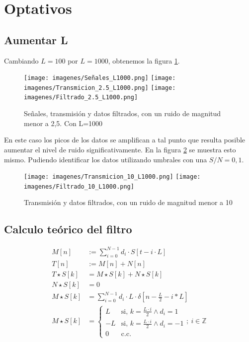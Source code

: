 \documentclass[12pt,letterpaper]{article}     %
\begin{document}
\clearpage
\section{Optativos}
\subsection{Aumentar L}

Cambiando $L=100$ por $L=1000$, obtenemos la figura \ref{fig:L1000}.

\begin{figure}[!ht]
\centering
\texttt{[image: imagenes/Señales\_L1000.png]}
\texttt{[image: imagenes/Transmicion\_2.5\_L1000.png]}
\texttt{[image: imagenes/Filtrado\_2.5\_L1000.png]}
\caption{Señales, transmisión y datos filtrados, con un ruido de magnitud menor a 2,5. Con L=1000}
\label{fig:L1000}
\end{figure}

En este caso los picos de los datos se amplifican a tal punto que resulta posible aumentar el nivel de ruido
significativamente. En la figura \ref{fig:Ruido10} se muestra esto mismo. Pudiendo identificar los datos 
utilizando umbrales con una $S/N = 0,1$.

\begin{figure}[!ht]
\centering
\texttt{[image: imagenes/Transmicion\_10\_L1000.png]}
\texttt{[image: imagenes/Filtrado\_10\_L1000.png]}
\caption{Transmisión y datos filtrados, con un ruido de magnitud menor a 10}
\label{fig:Ruido10}
\end{figure}

\subsection{Calculo teórico del filtro}

\begin{equation}
	\begin{split}
		M[n] &:= 
		\sum_{
			i=0
		}^{
			N-1
		}
		d_i\cdot S[t-i\cdot L]\\
		T[n] &:= M[n] + N[n]\\
		T\star S[k] &= M\star S[k] + N\star S[k]\\
		N\star S[k] &= 0\\
		M\star S[k] &= \sum_{
			i=0
		}^{
			N-1
		}
		d_i\cdot L\cdot\delta[n-\frac{L}{2}-i*L]\\
		M\star S[k] &= 
		\begin{cases}
			L & \text{si, }k=\frac{L\cdot i}{2}\wedge d_i=1\\
			-L & \text{si, }k=\frac{L\cdot i}{2}\wedge d_i=-1\\
			0 & \text{c.c.}
		\end{cases}
		;\ i\in\mathbb{Z}
	\end{split}
\end{equation}
\end{document}
